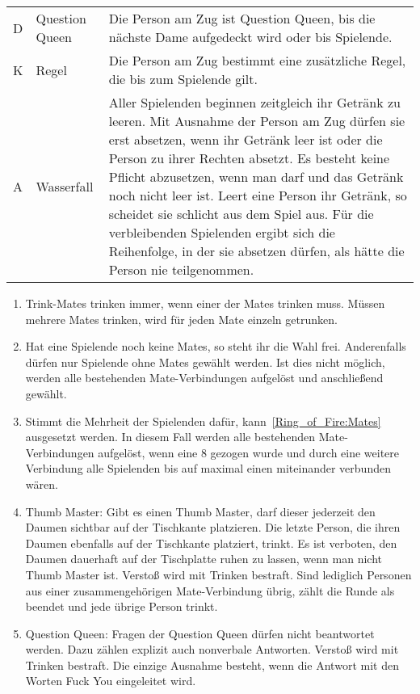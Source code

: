 \begin{tabulary}{\textwidth}{llL}
	D  & Question Queen & Die Person am Zug ist Question Queen, bis die nächste Dame aufgedeckt wird oder bis Spielende.                                                       \\[1ex]
	K  & Regel          & Die Person am Zug bestimmt eine zusätzliche Regel, die bis zum Spielende gilt.                                                                       \\[1ex]
	A  & Wasserfall     & Aller Spielenden beginnen zeitgleich ihr Getränk zu leeren.
	Mit Ausnahme der Person am Zug dürfen sie erst absetzen, wenn ihr Getränk leer ist oder die Person zu ihrer Rechten absetzt.
	Es besteht keine Pflicht abzusetzen, wenn man darf und das Getränk noch nicht leer ist.
	Leert eine Person ihr Getränk, so scheidet sie schlicht aus dem Spiel aus.
	Für die verbleibenden Spielenden ergibt sich die Reihenfolge, in der sie absetzen dürfen, als hätte die Person nie teilgenommen.                                           \\[1ex]
	\bottomrule
\end{tabulary}

\begin{enumerate}[start=3,label={(\arabic*)}]
	\item
	Trink-Mates trinken immer, wenn einer der Mates trinken muss.
	Müssen mehrere Mates trinken, wird für jeden Mate einzeln getrunken.
	
	\item\label{Ring_of_Fire:Mates}
	Hat eine Spielende noch keine Mates, so steht ihr die Wahl frei.
	Anderenfalls dürfen nur Spielende ohne Mates gewählt werden.
	Ist dies nicht möglich, werden alle bestehenden Mate-Verbindungen aufgelöst und anschließend gewählt.
	
	\item
	Stimmt die Mehrheit der Spielenden dafür, kann~\ref{Ring_of_Fire:Mates} ausgesetzt werden.
	In diesem Fall werden alle bestehenden Mate-Verbindungen aufgelöst, wenn eine 8 gezogen wurde und durch eine weitere Verbindung alle Spielenden bis auf maximal einen miteinander verbunden wären.
	
	\item
	Thumb Master: Gibt es einen Thumb Master, darf dieser jederzeit den Daumen sichtbar auf der Tischkante platzieren.
	Die letzte Person, die ihren Daumen ebenfalls auf der Tischkante platziert, trinkt.
	Es ist verboten, den Daumen dauerhaft auf der Tischplatte ruhen zu lassen, wenn man nicht Thumb Master ist.
	Verstoß wird mit Trinken bestraft.
	Sind lediglich Personen aus einer zusammengehörigen Mate-Verbindung übrig, zählt die Runde als beendet und jede übrige Person trinkt.
	
	\item
	Question Queen: Fragen der Question Queen dürfen nicht beantwortet werden.
	Dazu zählen explizit auch nonverbale Antworten. Verstoß wird mit Trinken bestraft.
	Die einzige Ausnahme besteht, wenn die Antwort mit den Worten \glqq{} Fuck You\grqq{} eingeleitet wird.
\end{enumerate}

